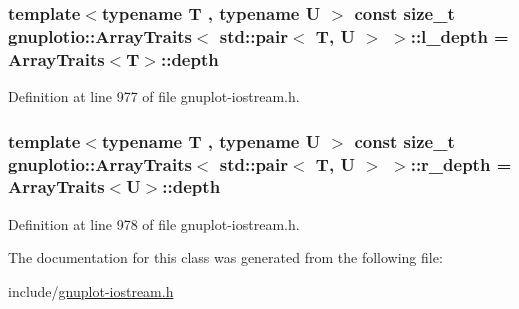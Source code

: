 \subsubsection[{\texorpdfstring{l\+\_\+depth}{l_depth}}]{\setlength{\rightskip}{0pt plus 5cm}template$<$typename T , typename U $>$ const size\+\_\+t {\bf gnuplotio\+::\+Array\+Traits}$<$ std\+::pair$<$ T, U $>$ $>$\+::l\+\_\+depth = {\bf Array\+Traits}$<$T$>$\+::{\bf depth}\hspace{0.3cm}{\ttfamily [static]}}\hypertarget{classgnuplotio_1_1_array_traits_3_01std_1_1pair_3_01_t_00_01_u_01_4_01_4_ae8be9661c88a8970da3d87c1afc063dc}{}\label{classgnuplotio_1_1_array_traits_3_01std_1_1pair_3_01_t_00_01_u_01_4_01_4_ae8be9661c88a8970da3d87c1afc063dc}


Definition at line 977 of file gnuplot-\/iostream.\+h.

\subsubsection[{\texorpdfstring{r\+\_\+depth}{r_depth}}]{\setlength{\rightskip}{0pt plus 5cm}template$<$typename T , typename U $>$ const size\+\_\+t {\bf gnuplotio\+::\+Array\+Traits}$<$ std\+::pair$<$ T, U $>$ $>$\+::r\+\_\+depth = {\bf Array\+Traits}$<$U$>$\+::{\bf depth}\hspace{0.3cm}{\ttfamily [static]}}\hypertarget{classgnuplotio_1_1_array_traits_3_01std_1_1pair_3_01_t_00_01_u_01_4_01_4_a1b7e7f8976a5d0ed20b93ede3e25a546}{}\label{classgnuplotio_1_1_array_traits_3_01std_1_1pair_3_01_t_00_01_u_01_4_01_4_a1b7e7f8976a5d0ed20b93ede3e25a546}


Definition at line 978 of file gnuplot-\/iostream.\+h.



The documentation for this class was generated from the following file\+:\begin{DoxyCompactItemize}
\item 
include/\hyperlink{gnuplot-iostream_8h}{gnuplot-\/iostream.\+h}\end{DoxyCompactItemize}
